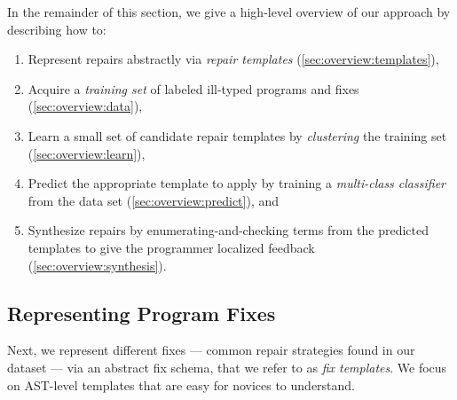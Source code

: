 In the remainder of this section, we give a high-level overview of our approach 
by describing how to:

\begin{enumerate}

  \item Represent repairs abstractly via \emph{repair templates} (\autoref{sec:overview:templates}), 

  \item Acquire a \emph{training set} of labeled ill-typed programs and fixes (\autoref{sec:overview:data}),

  \item Learn a small set of candidate repair templates by \emph{clustering} the training set (\autoref{sec:overview:learn}),

  \item Predict the appropriate template to apply by training a \emph{multi-class classifier} from the data set (\autoref{sec:overview:predict}), and  

  \item Synthesize repairs by enumerating-and-checking terms from the predicted templates to give the programmer localized feedback (\autoref{sec:overview:synthesis}).

\end{enumerate}

\begin{comment}
\emph{fixing} an erroneous program as a \emph{supervised multi-class classification problem}, whose results
are then fed to a \emph{program synthesizer}. A multi-class classification
problem entails learning a function that maps inputs to a discrete set of
usually more than two output labels. A supervised learning problem is one in
with an available training set where the inputs and labels are known, and the
task is to learn a function that accurately maps the inputs to output labels and
generalizes to future inputs. Finally, program synthesis is a problem where,
given a input high-level specification, a new program over some language is
requested as output.
\end{comment}


\subsection{Representing Program Fixes}
\label{sec:overview:templates} 

Next, we represent different fixes --- \ie common repair strategies found in our
dataset --- via an abstract fix schema, that we refer to as \emph{fix
templates}. We focus on AST-level templates that are easy for novices to
understand.

